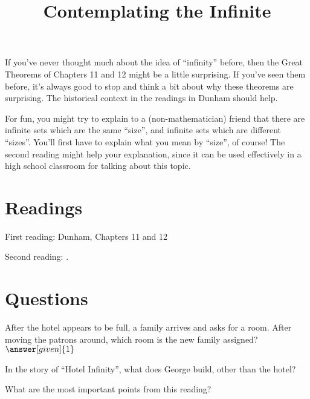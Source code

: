 \documentclass[nooutcomes]{ximera}
\title{Contemplating the Infinite}
\begin{document}
\begin{abstract}
    
\end{abstract}
\maketitle

If you've never thought much about the idea of ``infinity'' before, then the Great Theorems of Chapters 11 and 12 might be a little surprising.  If you've seen them before, it's always good to stop and think a bit about why these theorems are surprising.  The historical context in the readings in Dunham should help.

For fun, you might try to explain to a (non-mathematician) friend that there are infinite sets which are the same ``size'', and infinite sets which are different ``sizes''.  You'll first have to explain what you mean by ``size'', of course!  The second reading might help your explanation, since it can be used effectively in a high school classroom for talking about this topic.




\section{Readings}
First reading: Dunham, Chapters 11 and 12

Second reading: .



\section{Questions}

\begin{question}
After the hotel appears to be full, a family arrives and asks for a room.  After moving the patrons around, which room is the new family assigned?
$\answer[given]{1}$
\end{question}

\begin{question}
In the story of ``Hotel Infinity'', what does George build, other than the hotel?
\begin{multipleChoice}
\end{multipleChoice}
\end{question}


\begin{question}
What are the most important points from this reading?
\begin{freeResponse}
\end{freeResponse}

\end{question}
\end{document}
